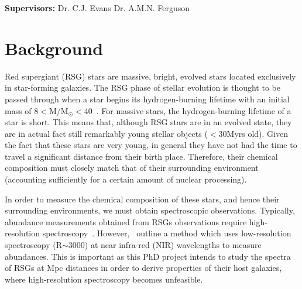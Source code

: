 \documentclass[a4paper,12pt]{article}
\begin{document}
\vfill
{\bf Supervisors:} Dr. C.J. Evans \hfill Dr. A.M.N. Ferguson               %
\newpage
\setcounter{page}{1}                            %
\footruleheight{1pt}
\headruleheight{1pt}
\rhead{- \thepage}
\cfoot{}
%
\tableofcontents                                %
\section{Background}
%

Red supergiant (RSG) stars are massive, bright, evolved stars located exclusively in star-forming galaxies.
The RSG phase of stellar evolution is thought to be passed through when a star begins its hydrogen-burning lifetime with an initial mass of 8$<$M/M$_{\odot}<$40~\citep{Massey03, Crowther07, Meynet11}. 
For massive stars, the hydrogen-burning lifetime of a star is short.
This means that, although RSG stars are in an evolved state, they are in actual fact still remarkably young stellar objects ($<$30Myrs old). 
Given the fact that these stars are very young, in general they have not had the time to travel a significant distance from their birth place. 
Therefore, their chemical composition must closely match that of their surrounding environment (accounting sufficiently for a certain amount of nuclear processing).


In order to measure the chemical composition of these stars, and hence their surrounding environments, we must obtain spectroscopic observations.
Typically, abundance measurements obtained from RSGs observations require high-resolution spectroscopy~\citep[R$\ge$ 20\,000;][]{Cunha07, Davies09a, Davies09b}.
However,~\cite{Davies10} outline a method which uses low-resolution spectroscopy (R$\sim$3000) at near infra-red (NIR) wavelengths to measure abundances. 
This is important as this PhD project intends to study the spectra of RSGs at Mpc distances in order to derive properties of their host galaxies, where high-resolution spectroscopy becomes unfeasible. 
\end{document}
